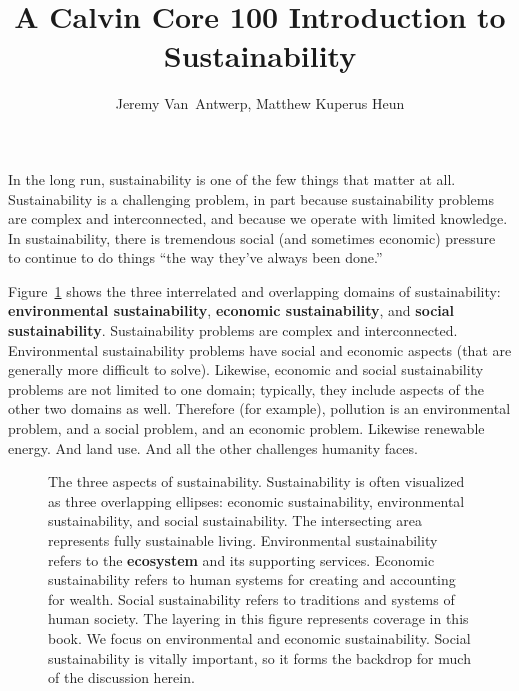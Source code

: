 \documentclass{article}\usepackage[]{graphicx}\usepackage[]{xcolor}
\begin{document}
  

\title{A Calvin Core 100 Introduction to Sustainability}
\author{Jeremy Van~Antwerp, Matthew Kuperus Heun}

\maketitle

In the long run, sustainability is one of the few things that matter at all.
Sustainability is a challenging problem, in part
because sustainability problems are complex and interconnected,
and because we operate with limited knowledge.
In sustainability, there is tremendous social (and sometimes economic) pressure
to continue to do things ``the way they've always been done.''

Figure~\ref{fig:venn_diagram} shows the three interrelated and overlapping
domains of sustainability:
\textbf{environmental sustainability},
\textbf{economic sustainability}, and
\textbf{social sustainability}.
Sustainability problems are complex and interconnected.
Environmental sustainability problems have social and economic aspects 
(that are generally more difficult to solve).
Likewise, economic and social sustainability problems are not limited to one domain;
typically, they include aspects of the other two domains as well.
Therefore (for example), pollution is an environmental problem, and a social problem, and an economic problem.
Likewise renewable energy. And land use. 
And all the other challenges humanity faces.

\begin{figure}
\centering

  

  \caption[Three aspects of sustainability]
          {The three aspects of sustainability.
           Sustainability is often visualized as three overlapping ellipses:
           economic sustainability,
           environmental sustainability, and
           social sustainability.
           The intersecting area represents fully sustainable living.
           Environmental sustainability
           refers to the \textbf{ecosystem} and its supporting services.
           Economic sustainability refers to human systems for creating 
           and accounting for wealth.
           Social sustainability refers to traditions and systems of human society.
           The layering in this figure represents coverage in this book.
           We focus on environmental and
           economic sustainability.
           Social sustainability is vitally important, so it forms the backdrop
           for much of the discussion herein.}
\label{fig:venn_diagram}
\end{figure}
\end{document}

